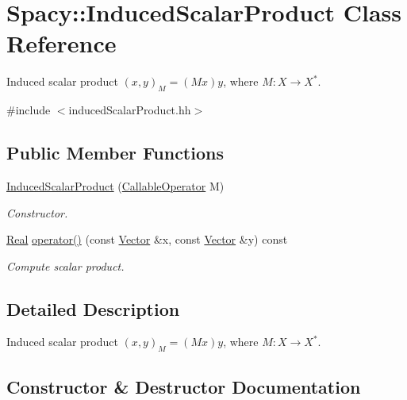 \hypertarget{classSpacy_1_1InducedScalarProduct}{}\section{Spacy\+:\+:Induced\+Scalar\+Product Class Reference}
\label{classSpacy_1_1InducedScalarProduct}


Induced scalar product $(x,y)_M = (Mx)y$, where $M:X\rightarrow X^*$.  




{\ttfamily \#include $<$induced\+Scalar\+Product.\+hh$>$}

\subsection*{Public Member Functions}
\begin{DoxyCompactItemize}
\item 
\hyperlink{classSpacy_1_1InducedScalarProduct_a19126347daec01565853232a7e3d2b72_a19126347daec01565853232a7e3d2b72}{Induced\+Scalar\+Product} (\hyperlink{group__SpacyGroup_ga2b74020d806ad800795cdd97dab3466f_ga2b74020d806ad800795cdd97dab3466f}{Callable\+Operator} M)
\begin{DoxyCompactList}\small\item\em Constructor. \end{DoxyCompactList}\item 
\hyperlink{classSpacy_1_1Real}{Real} \hyperlink{classSpacy_1_1InducedScalarProduct_ab16021f05080b32714276f9b125df8af_ab16021f05080b32714276f9b125df8af}{operator()} (const \hyperlink{classSpacy_1_1Vector}{Vector} \&x, const \hyperlink{classSpacy_1_1Vector}{Vector} \&y) const 
\begin{DoxyCompactList}\small\item\em Compute scalar product. \end{DoxyCompactList}\end{DoxyCompactItemize}


\subsection{Detailed Description}
Induced scalar product $(x,y)_M = (Mx)y$, where $M:X\rightarrow X^*$. 

\subsection{Constructor \& Destructor Documentation}
\hypertarget{classSpacy_1_1InducedScalarProduct_a19126347daec01565853232a7e3d2b72_a19126347daec01565853232a7e3d2b72}{}
